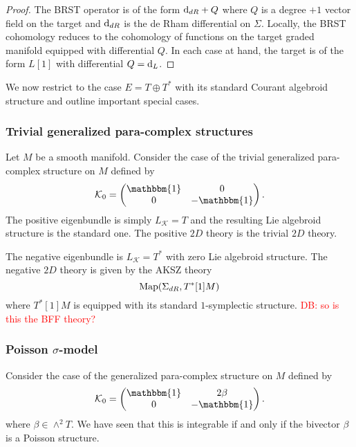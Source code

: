 \documentclass[letterpaper,12pt]{article}
\newcommand{\TT}{{T\oplus T^*}}
\newcommand{\KK}{\mathcal{K}}
\def\d{{\rm d}}
\newcommand{\id}{\mathbbm{1}}
\theoremstyle{definition}
\theoremstyle{remark}
\theoremstyle{examples}
\def\david{\textcolor{red}{DB: }\textcolor{red}}
\begin{document}
\begin{proof}
The BRST operator is of the form $\d_{dR} + Q$ where $Q$ is a degree $+1$ vector field on the target and $\d_{dR}$ is the de Rham differential on $\Sigma$.  
Locally, the BRST cohomology reduces to the cohomology of functions on the target graded manifold equipped with differential $Q$.
In each case at hand, the target is of the form $L[1]$ with differential $Q = \d_L$.
\end{proof}

We now restrict to the case $E = \TT$ with its standard Courant algebroid structure and outline important special cases.

\subsubsection*{Trivial generalized para-complex structures}

Let $M$ be a smooth manifold.
Consider the case of the trivial generalized para-complex structure on $M$ defined by
\begin{align*}
\KK_0=
\begin{pmatrix}
\id & 0 \\
0 & -\id
\end{pmatrix}.
\end{align*}
The positive eigenbundle is simply $L_\KK = T$ and the resulting Lie algebroid structure is the standard one.
The positive $2D$ theory is the trivial $2D$ theory.  

The negative eigenbundle is $L_{\KK} = T^*$ with zero Lie algebroid structure.
The negative $2D$ theory is given by the AKSZ theory
\[
{\rm Map}(\Sigma_{dR} , T^*[1] M)
\]
where $T^*[1]M$ is equipped with its standard $1$-symplectic structure. \david{so is this the BFF theory?}

\subsubsection*{Poisson $\sigma$-model}
Consider the case of the generalized para-complex structure on $M$ defined by
\begin{align*}
\KK_0=
\begin{pmatrix}
\id & 2 \beta \\
0 & -\id
\end{pmatrix}.
\end{align*}
where $\beta \in \wedge^2 T$.
We have seen that this is integrable if and only if the bivector $\beta$ is a Poisson structure. 
\end{document}
